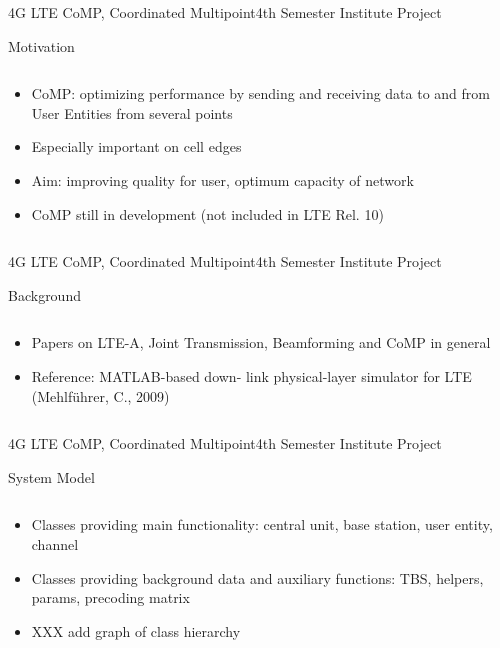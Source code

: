 \documentclass[xcolor={cmyk}]{beamer}
\begin{document}
 \begin{frame}{4G LTE CoMP, Coordinated Multipoint}{4th Semester Institute Project}
	 \begin{block}{Motivation}
	 	\begin{columns}
			\begin{column}{.9\textwidth}
				\begin{itemize}
					\item CoMP: optimizing performance by sending and receiving data to and from User Entities from several points
					\item Especially important on cell edges
					\item Aim: improving quality for user, optimum capacity of network 
					\item CoMP still in development (not included in LTE Rel. 10)
				\end{itemize}
			\end{column}
		\end{columns}
	 \end{block}
 \end{frame}
 \begin{frame}{4G LTE CoMP, Coordinated Multipoint}{4th Semester Institute Project}
	 \begin{block}{Background}
	 	\begin{columns}
			\begin{column}{.9\textwidth}
				\begin{itemize}
					\item Papers on LTE-A, Joint Transmission, Beamforming and CoMP in general
					\item Reference: MATLAB-based down-
link physical-layer simulator for LTE (Mehlführer, C., 2009)
				\end{itemize}
			\end{column}
		\end{columns}
	 \end{block}
 \end{frame}

 \begin{frame}{4G LTE CoMP, Coordinated Multipoint}{4th Semester Institute Project}
	 \begin{block}{System Model}
	 	\begin{columns}
			\begin{column}{.9\textwidth}
				\begin{itemize}
					\item Classes providing main functionality: central unit, base station, user entity, channel
					\item Classes providing background data and auxiliary functions: TBS, helpers, params, precoding matrix
					\item XXX add graph of class hierarchy
				\end{itemize}
			\end{column}
		\end{columns}
	 \end{block}
 \end{frame}
 
\end{document}
